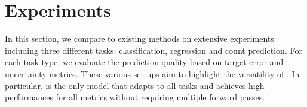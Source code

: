 \section{Experiments}
\label{sec:experiments_007}

In this section, we compare \NatPNacro{} to existing methods on extensive experiments including three different tasks: classification, regression and count prediction. For each task type, we evaluate the prediction quality based on target error and uncertainty metrics. These various set-ups aim to highlight the versatility of \NatPNacro{}. In particular, \NatPNacro{} is the only model that adapts to all tasks and achieves high performances for all metrics without requiring multiple forward passes.

\begin{table}[ht]
    \centering
    \vspace{-1mm}
   \caption{Classification results on Sensorless Drive with Categorical target distribution. Best scores among all single-pass models are in bold. Best scores among all models are starred.}
    \label{tab:sensorless-drive}
    \vspace{-3mm}
            \vspace{-0mm}
\end{table}

